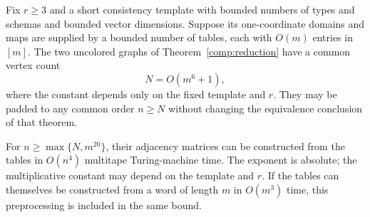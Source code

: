 \begin{lemma}
\label{circ:construction}
Fix $r\geq3$ and a short consistency template with bounded numbers of types
and schemas and bounded vector dimensions. Suppose its one-coordinate
domains and maps are supplied by a bounded number of tables, each with
$O(m)$ entries in $[m]$. The two uncolored graphs of
Theorem~\ref{comp:reduction} have a common vertex count
\[
 N=O(m^6+1),
\]
where the constant depends only on the fixed template and $r$.
They may be padded to any common order $n\geq N$ without changing the
equivalence conclusion of that theorem.

For $n\geq\max\{N,m^{20}\}$, their adjacency matrices can be constructed
from the tables in $O(n^4)$ multitape Turing-machine time. The exponent is
absolute; the multiplicative constant may depend on the template and $r$.
If the tables can themselves be constructed from a word of length $m$ in
$O(m^3)$ time, this preprocessing is included in the same bound.
\end{lemma}

